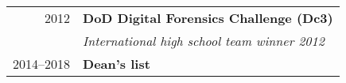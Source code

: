 \documentclass[10pt]{article} %
\begin{document}
{\begin{minipage}[t]{0.44\textwidth}
\begin{tabular}{rl}
2012	 & \textbf{DoD Digital Forensics Challenge (Dc3)}\\
& \textit{International high school team winner 2012} \\
2014--2018 & \textbf{Dean's list}


\end{tabular}\\[10pt]












\end{minipage} %
}
\end{document}
